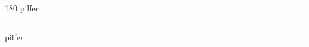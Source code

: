 
\begin{frame}
\begin{center}
\begin{turn}{180}
{\fontsize{2.5cm}{1em}\selectfont pilfer}
\end{turn}
\vspace{1em}\par  
\hrule
\vspace{1em}\par  
{\fontsize{2.5cm}{1em}\selectfont pilfer}
\end{center}
\end{frame}
